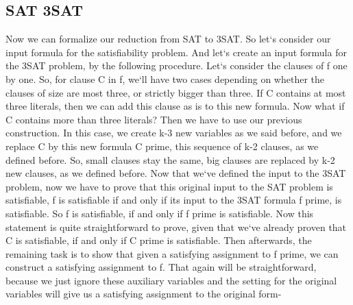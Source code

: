 \subsection{SAT 3SAT}
Now we can formalize our reduction from SAT to 3SAT\@.
So let`s consider our input formula for the satisfiability problem.
And let`s create an input formula for the 3SAT problem, by the following procedure.
Let`s consider the clauses of f one by one.
So, for clause C in f, we`ll have two cases depending on whether the clauses of size are most three, or strictly bigger than three.
If C contains at most three literals, then we can add this clause as is to this new formula.
Now what if C contains more than three literals? Then we have to use our previous construction.
In this case, we create k-3 new variables as we said before, and we replace C by this new formula C prime, this sequence of k-2 clauses, as we defined before.
So, small clauses stay the same, big clauses are replaced by k-2 new clauses, as we defined before.
Now that we`ve defined the input to the 3SAT problem, now we have to prove that this original input to the SAT problem is satisfiable, f is satisfiable if and only if its input to the 3SAT formula f prime, is satisfiable.
So f is satisfiable, if and only if f prime is satisfiable.
Now this statement is quite straightforward to prove, given that we`ve already proven that C is satisfiable, if and only if C prime is satisfiable.
Then afterwards, the remaining task is to show that given a satisfying assignment to f prime, we can construct a satisfying assignment to f.
That again will be straightforward, because we just ignore these auxiliary variables and the setting for the original variables will give us a satisfying assignment to the original form-

